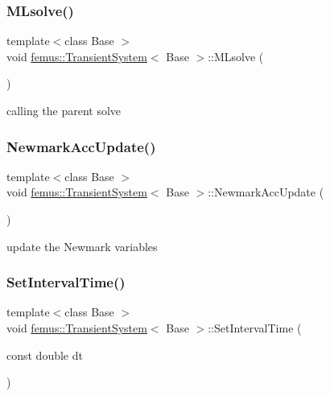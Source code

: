 \subsubsection{\texorpdfstring{M\+Lsolve()}{MLsolve()}}
{\footnotesize\ttfamily template$<$class Base $>$ \\
void \mbox{\hyperlink{classfemus_1_1_transient_system}{femus\+::\+Transient\+System}}$<$ Base $>$\+::M\+Lsolve (\begin{DoxyParamCaption}{ }\end{DoxyParamCaption})\hspace{0.3cm}{\ttfamily [virtual]}}

calling the parent solve \mbox{\label{classfemus_1_1_transient_system_ae34a0bdb4bc4cadfb9f4c45124c2cbd9}} 
\subsubsection{\texorpdfstring{Newmark\+Acc\+Update()}{NewmarkAccUpdate()}}
{\footnotesize\ttfamily template$<$class Base $>$ \\
void \mbox{\hyperlink{classfemus_1_1_transient_system}{femus\+::\+Transient\+System}}$<$ Base $>$\+::Newmark\+Acc\+Update (\begin{DoxyParamCaption}{ }\end{DoxyParamCaption})}

update the Newmark variables \mbox{\label{classfemus_1_1_transient_system_ac4c3f2853cb04407fbe2975d18c9bf2a}} 
\subsubsection{\texorpdfstring{Set\+Interval\+Time()}{SetIntervalTime()}}
{\footnotesize\ttfamily template$<$class Base $>$ \\
void \mbox{\hyperlink{classfemus_1_1_transient_system}{femus\+::\+Transient\+System}}$<$ Base $>$\+::Set\+Interval\+Time (\begin{DoxyParamCaption}\item[{const double}]{dt }\end{DoxyParamCaption})\hspace{0.3cm}{\ttfamily [inline]}}

